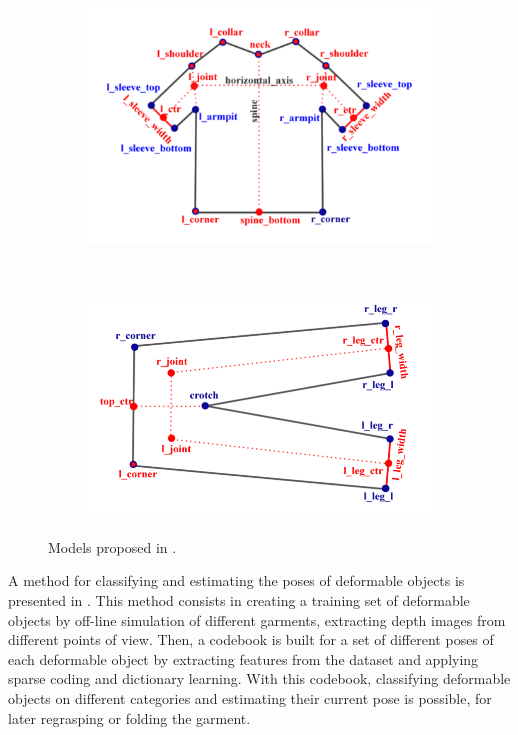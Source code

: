 \begin{figure}[htbp]
	\centering
    \begin{subfigure}[l]{0.49\textwidth}
        \centering
    	\includegraphics[width=\textwidth]
    	{figures/SOTA_Miller_2011.png}
    \end{subfigure}
    ~
    \begin{subfigure}[r]{0.49\textwidth}
	   \centering
		\includegraphics[width=\textwidth]
		{figures/SOTA_Miller_2011-2.png}
	\end{subfigure} 
   	\caption[Models proposed by Miller et al.]
   	{Models proposed in \cite{Miller2011}.}
   	\label{fig:SOTA_Miller_2011}
\end{figure}

A method for classifying and estimating the poses of deformable objects is presented in \cite{Li2014ICRA}. This method consists in creating a training set of deformable objects by off-line simulation of different garments, extracting depth images from different points of view. Then, a codebook is built for a set of different poses of each deformable object by extracting features from the dataset and applying sparse coding and dictionary learning. With this codebook, classifying deformable objects on different categories and estimating their current pose is possible, for later regrasping or folding the garment.

